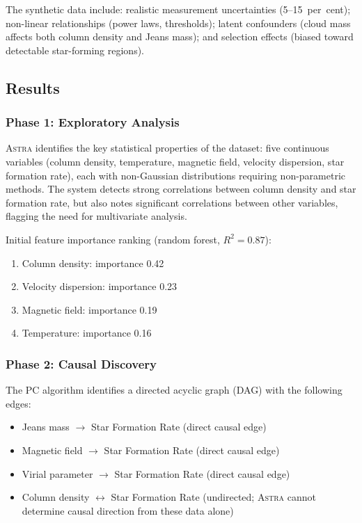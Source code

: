 \documentclass[fleqn,usenatbib]{mnras}
\newcommand{\astra}{\textsc{Astra}\xspace}
\newcommand{\pc}{PC\xspace}
\begin{document}
The synthetic data include: realistic measurement uncertainties (5--15~per~cent); non-linear relationships (power laws, thresholds); latent confounders (cloud mass affects both column density and Jeans mass); and selection effects (biased toward detectable star-forming regions).

\subsection{Results}
\label{sec:tc6:results}

\subsubsection{Phase 1: Exploratory Analysis}
\label{sec:tc6:phase1}

\astra identifies the key statistical properties of the dataset: five continuous variables (column density, temperature, magnetic field, velocity dispersion, star formation rate), each with non-Gaussian distributions requiring non-parametric methods.
The system detects strong correlations between column density and star formation rate, but also notes significant correlations between other variables, flagging the need for multivariate analysis.

Initial feature importance ranking (random forest, $R^{2} = 0.87$):
\begin{enumerate}
  \item[(i)] Column density: importance 0.42
  \item[(ii)] Velocity dispersion: importance 0.23
  \item[(iii)] Magnetic field: importance 0.19
  \item[(iv)] Temperature: importance 0.16
\end{enumerate}

\subsubsection{Phase 2: Causal Discovery}
\label{sec:tc6:phase2}

The \pc algorithm identifies a directed acyclic graph (DAG) with the following edges:
\begin{itemize}
  \item Jeans mass $\rightarrow$ Star Formation Rate (direct causal edge)
  \item Magnetic field $\rightarrow$ Star Formation Rate (direct causal edge)
  \item Virial parameter $\rightarrow$ Star Formation Rate (direct causal edge)
  \item Column density $\leftrightarrow$ Star Formation Rate (undirected; \astra cannot determine causal direction from these data alone)
\end{itemize}
\end{document}
